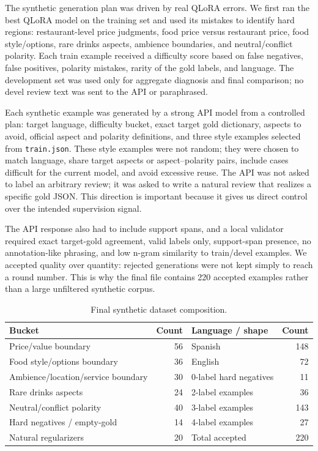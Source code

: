 \documentclass[11pt,a4paper]{article}
\newcommand{\code}[1]{\texttt{#1}}
\begin{document}
The synthetic generation plan was driven by real QLoRA errors. We first ran the best QLoRA model on the training set and used its mistakes to identify hard regions: restaurant-level price judgments, food price versus restaurant price, food style/options, rare drinks aspects, ambience boundaries, and neutral/conflict polarity. Each train example received a difficulty score based on false negatives, false positives, polarity mistakes, rarity of the gold labels, and language. The development set was used only for aggregate diagnosis and final comparison; no devel review text was sent to the API or paraphrased.

Each synthetic example was generated by a strong API model from a controlled plan: target language, difficulty bucket, exact target gold dictionary, aspects to avoid, official aspect and polarity definitions, and three style examples selected from \code{train.json}. These style examples were not random; they were chosen to match language, share target aspects or aspect--polarity pairs, include cases difficult for the current model, and avoid excessive reuse. The API was not asked to label an arbitrary review; it was asked to write a natural review that realizes a specific gold JSON. This direction is important because it gives us direct control over the intended supervision signal.

The API response also had to include support spans, and a local validator required exact target-gold agreement, valid labels only, support-span presence, no annotation-like phrasing, and low n-gram similarity to train/devel examples. We accepted quality over quantity: rejected generations were not kept simply to reach a round number. This is why the final file contains 220 accepted examples rather than a large unfiltered synthetic corpus.

\begin{table}[H]
    \centering
    \small
    \setlength{\tabcolsep}{4pt}
    \caption{Final synthetic dataset composition.}
    \label{tab:synthetic}
    \begin{tabular}{@{}lrlr@{}}
        \toprule
        Bucket & Count & Language / shape & Count \\
        \midrule
        Price/value boundary & 56 & Spanish & 148 \\
        Food style/options boundary & 36 & English & 72 \\
        Ambience/location/service boundary & 30 & 0-label hard negatives & 11 \\
        Rare drinks aspects & 24 & 2-label examples & 36 \\
        Neutral/conflict polarity & 40 & 3-label examples & 143 \\
        Hard negatives / empty-gold & 14 & 4-label examples & 27 \\
        Natural regularizers & 20 & Total accepted & 220 \\
        \bottomrule
    \end{tabular}
\end{table}
\end{document}
